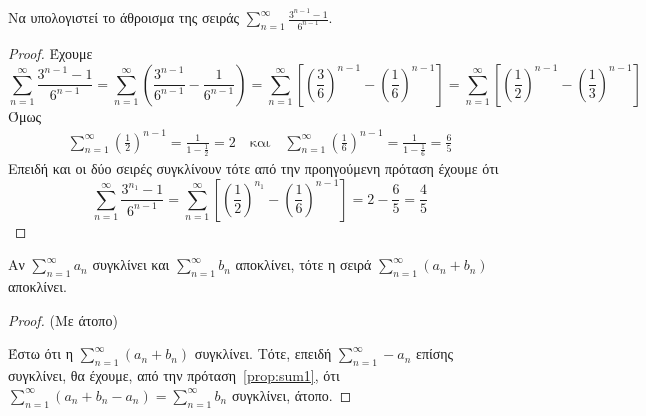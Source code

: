 \documentclass[a4paper,table]{report}
\begin{document}
\begin{example}
\begin{enumerate}
        \item Να υπολογιστεί το άθροισμα της σειράς $ \sum_{n=1}^{\infty} 
            \frac{3^{n-1}-1}{6^{n-1}} $.
            \begin{proof}
            \item {}
                Έχουμε 
                \[ 
                    \sum_{n=1}^{\infty} \frac{3^{n-1}-1}{6^{n-1}} = \sum_{n=1}^{\infty} 
                    \left(\frac{3^{n-1}}{6^{n-1}} - \frac{1}{6^{n-1}}\right) = 
                    \sum_{n=1}^{\infty} \left[\left(\frac{3}{6} \right)^{n-1} -
                    \left( \frac{1}{6}\right) ^{n-1}\right] = \sum_{n=1}^{\infty} 
                    \left[\left(\frac{1}{2} \right)^{n-1} - \left(\frac{1}{3} 
                    \right)^{n-1}\right]
                \]
                Όμως 
                \begin{align*}
                    \sum_{n=1}^{\infty} \left(\frac{1}{2} \right)^{n-1} 
                    = \frac{1}{1- \frac{1}{2}} = 2
                    \quad \text{και} \quad
                    \sum_{n=1}^{\infty} \left(\frac{1}{6} \right)^{n-1} 
                    = \frac{1}{1- \frac{1}{6}} = \frac{6}{5} 
                \end{align*} 
                Επειδή και οι δύο σειρές συγκλίνουν τότε από την προηγούμενη 
                πρόταση έχουμε ότι 
                \[
                    \sum_{n=1}^{\infty} \frac{3^{n_1}-1}{6^{n-1}} =  
                    \sum_{n=1}^{\infty} \left[\left(\frac{1}{2} \right)^{n_1} - 
                    \left(\frac{1}{6} \right)^{n-1}\right] = 2 - \frac{6}{5} = 
                    \frac{4}{5} 
                \] 
            \end{proof}
    \end{enumerate}
\end{example}

\begin{mybox3}
\begin{prop}
  Αν $ \sum_{n=1}^{\infty} a_{n} $ συγκλίνει και $ \sum_{n=1}^{\infty} b_{n} $ 
  αποκλίνει, τότε η σειρά $ \sum_{n=1}^{\infty} (a_{n}+b_{n}) $ αποκλίνει.
\end{prop}
\end{mybox3}
\begin{proof}(Με άτοπο)

  Έστω ότι η $ \sum_{n=1}^{\infty} (a_{n}+b_{n}) $ συγκλίνει. Τότε, επειδή $
  \sum_{n=1}^{\infty} - a_{n} $ επίσης συγκλίνει, θα έχουμε, από την
  πρόταση~\ref{prop:sum1}, ότι $ \sum_{n=1}^{\infty} (a_{n}+b_{n} - a_{n}) = 
  \sum_{n=1}^{\infty} b_{n} $ συγκλίνει, άτοπο.
\end{proof}
\end{document}
